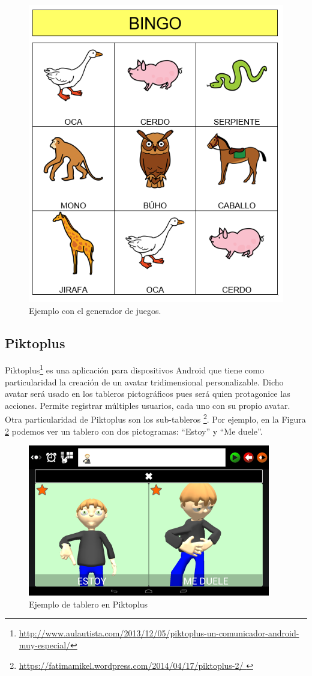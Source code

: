 \begin{itemize}
\begin{figure}[h!]
	\centering
	\includegraphics[width=0.7\linewidth]{Imagenes/Bitmap/juegoARASAAC}
	\caption{Ejemplo con el generador de juegos.}
	\label{fig:juegoarasaac}
\end{figure}



\end{itemize}

\subsection{Piktoplus}
Piktoplus\footnote{\url{http://www.aulautista.com/2013/12/05/piktoplus-un-comunicador-android-muy-especial/}} es una aplicación para dispositivos Android que tiene como particularidad la creación de un avatar tridimensional personalizable. Dicho avatar será usado en los tableros pictográficos pues será quien protagonice las acciones. Permite registrar múltiples usuarios, cada uno con su propio avatar. Otra particularidad de Piktoplus son los sub-tableros \footnote{\url{https://fatimamikel.wordpress.com/2014/04/17/piktoplus-2/ }}. Por ejemplo, en la Figura \ref{fig:piktoplus1}  podemos ver un tablero con dos pictogramas: “Estoy” y “Me duele”.


\begin{figure}[h!]
	\centering
	\includegraphics[width=0.5\linewidth]{Imagenes/Bitmap/Piktoplus1}
	\caption[Pictoplus tablero]{Ejemplo de tablero en Piktoplus}
	\label{fig:piktoplus1}
\end{figure}

